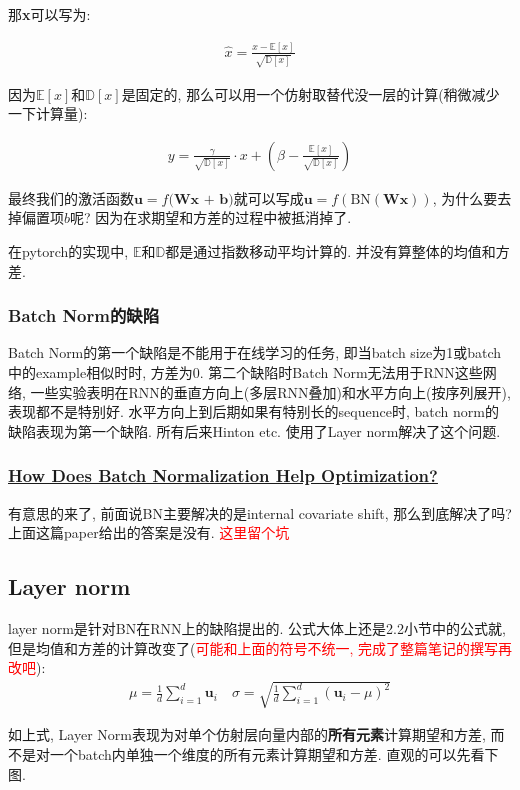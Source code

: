 \documentclass{article}
\begin{document}
那\textbf{x}可以写为:

\begin{align}
    \hat{x} = \frac{x - \mathbb{E}[x]}{\sqrt{\mathbb{D}[x]}}
\end{align}

因为$\mathbb{E}[x]$和$\mathbb{D}[x]$是固定的, 那么可以用一个仿射取替代没一层的计算(稍微减少一下计算量):

\begin{align}
    y = \tfrac{\gamma}{\sqrt{\mathbb{D}[x]}} \cdot x + (\beta - \tfrac{\mathbb{E}[x]}{\sqrt{\mathbb{D}[x]}})
\end{align}

最终我们的激活函数$\textbf{u} = f\textbf{(Wx + b)}$就可以写成$\textbf{u} = f(\text{BN}(\textbf{Wx}))$, 为什么要去掉偏置项$b$呢? 因为在求期望和方差的过程中被抵消掉了.

在pytorch的实现中, $\mathbb{E}$和$\mathbb{D}$都是通过指数移动平均计算的. 并没有算整体的均值和方差.

\subsubsection{Batch Norm的缺陷}

Batch Norm的第一个缺陷是不能用于在线学习的任务, 即当batch size为1或batch中的example相似时时, 方差为0.
第二个缺陷时Batch Norm无法用于RNN这些网络, 一些实验表明在RNN的垂直方向上(多层RNN叠加)和水平方向上(按序列展开),
表现都不是特别好. 水平方向上到后期如果有特别长的sequence时, batch norm的缺陷表现为第一个缺陷.
所有后来Hinton etc. 使用了Layer norm解决了这个问题.

\subsubsection{\href{http://arxiv.org/abs/1805.11604}{How Does Batch Normalization Help Optimization?}}

有意思的来了, 前面说BN主要解决的是internal covariate shift, 那么到底解决了吗?
上面这篇paper给出的答案是没有. \textcolor{red}{这里留个坑}


\subsection{Layer norm}

layer norm是针对BN在RNN上的缺陷提出的. 公式大体上还是2.2小节中的公式就, 
但是均值和方差的计算改变了(\textcolor{red}{可能和上面的符号不统一, 完成了整篇笔记的撰写再改吧}):
\begin{align}
    \mu = \frac{1}{d} \displaystyle \sum_{i=1}^{d} \textbf{u}_i \quad
    \sigma = \sqrt{\frac{1}{d} \displaystyle \sum_{i=1}^{d} (\textbf{u}_i - \mu)^2} 
\end{align}

如上式, Layer Norm表现为对单个仿射层向量内部的\textbf{所有元素}计算期望和方差,
而不是对一个batch内单独一个维度的所有元素计算期望和方差.
直观的可以先看下图.
\end{document}
